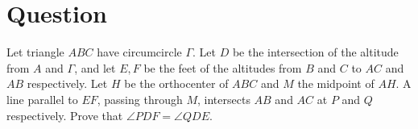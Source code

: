 \documentclass{extarticle}
\begin{document}
	\section{Question} %
	Let triangle $ABC$ have circumcircle $\Gamma$. Let $D$ be the intersection of the altitude from $A$ and $\Gamma$, and let $E,F$ be the feet of the altitudes from $B$ and $C$ to $AC$ and $AB$ respectively. Let $H$ be the orthocenter of $ABC$ and $M$ the midpoint of $AH$. A line parallel to $EF$, passing through $M$, intersects $AB$ and $AC$ at $P$ and $Q$ respectively. Prove that $\angle PDF = \angle QDE$.
	
\end{document}
